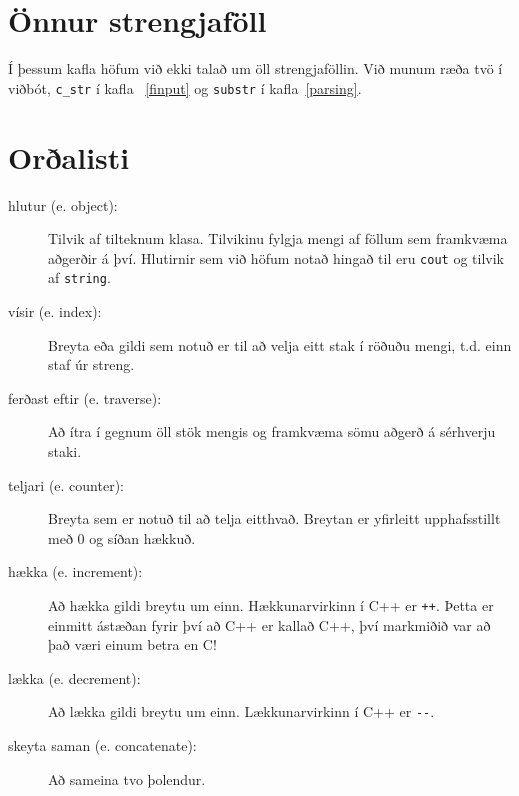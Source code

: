 \section{Önnur strengjaföll}

Í þessum kafla höfum við ekki talað um öll strengjaföllin.
Við munum ræða tvö í viðbót, {\tt c\_str} í kafla ~\ref{finput} og {\tt substr} í kafla~\ref{parsing}.

\section{Orðalisti}

\begin{description}

\item[hlutur (e. object):] Tilvik af tilteknum klasa. Tilvikinu fylgja mengi af föllum sem framkvæma aðgerðir á því.
Hlutirnir sem við höfum notað hingað til eru {\tt cout} og tilvik af {\tt string}.

\item[vísir (e. index):]  Breyta eða gildi sem notuð er til að velja eitt stak í röðuðu mengi, t.d. einn staf úr streng.

\item[ferðast eftir (e. traverse):]  Að ítra í gegnum öll stök mengis og framkvæma sömu aðgerð á sérhverju staki.

\item[teljari (e. counter):]  Breyta sem er notuð til að telja eitthvað. Breytan er yfirleitt upphafsstillt með 0 og síðan hækkuð.

\item[hækka (e. increment):]  Að hækka gildi breytu um einn.
Hækkunarvirkinn í C++ er {\tt ++}.  Þetta er einmitt ástæðan fyrir því að C++ er kallað C++, því markmiðið var að það væri einum betra en C!

\item[lækka (e. decrement):]  Að lækka gildi breytu um einn.
Lækkunarvirkinn í C++ er \verb+--+.

\item[skeyta saman (e. concatenate):] Að sameina tvo þolendur.


\end{description}
